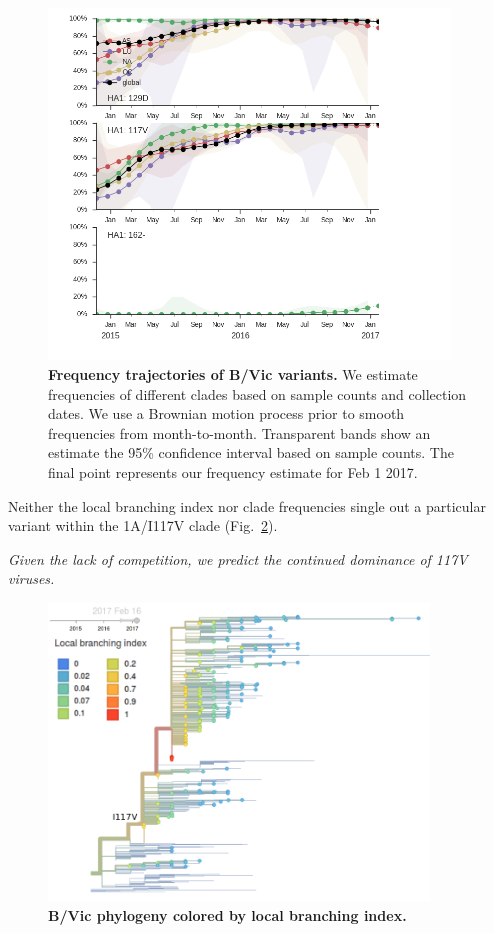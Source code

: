 \documentclass[11pt,oneside,letterpaper]{article}
\begin{document}
\begin{figure}[H]
	\centering
	\includegraphics[width=0.95\textwidth]{../figures/feb-2017/vic_frequencies.png}
	\caption{\textbf{Frequency trajectories of B/Vic variants.}
	We estimate frequencies of different clades based on sample counts and collection dates.
	We use a Brownian motion process prior to smooth frequencies from month-to-month.
	Transparent bands show an estimate the 95\% confidence interval based on sample counts.
	The final point represents our frequency estimate for Feb 1 2017.
	}
	\label{Vic_mutations}
\end{figure}

\pagebreak

Neither the local branching index nor clade frequencies single out a particular variant within the 1A/I117V clade (Fig.\ \ref{Vic_lbi}).

\textit{Given the lack of competition, we predict the continued dominance of 117V viruses.}

\begin{figure}[H]
	\centering
	\includegraphics[width=0.9\textwidth]{../figures/feb-2017/Vic_lbi.png}
	\caption{\textbf{B/Vic phylogeny colored by local branching index.}
	}
	\label{Vic_lbi}
\end{figure}
\end{document}
